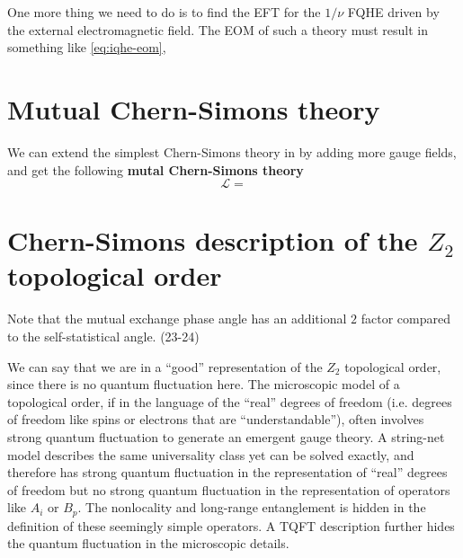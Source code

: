 \documentclass[hyperref, a4paper]{article}
\newcommand*{\concept}[1]{{\textbf{#1}}}
\def\mathbb#1{#1}%
\begin{document}
One more thing we need to do is to find the EFT for the $1 / \nu$ FQHE driven by the external electromagnetic field.
The EOM of such a theory must result in something like \eqref{eq:iqhe-eom}, 

\section{Mutual Chern-Simons theory}

We can extend the simplest Chern-Simons theory in  by adding more gauge fields, and get 
the following \concept{mutal Chern-Simons theory}
\begin{equation}
    \mathcal{L} = 
\end{equation}

\section{Chern-Simons description of the $\mathbb{Z}_2$ topological order}


Note that the mutual exchange phase angle has an additional $2$ factor compared to the self-statistical angle. (23-24) \cite{sachdev-lec10} 

We can say that we are in a ``good'' representation of the $\mathbb{Z}_2$ topological order, since there is no 
quantum fluctuation here. The microscopic model of a topological order, if in the language of the ``real'' 
degrees of freedom (i.e. degrees of freedom like spins or electrons that are ``understandable''), often involves strong quantum fluctuation to generate an emergent gauge theory.
A string-net model describes the same universality class yet can be solved exactly, and therefore has 
strong quantum fluctuation in the representation of ``real'' degrees of freedom but no strong quantum 
fluctuation in the representation of operators like $A_i$ or $B_p$. The nonlocality and long-range entanglement 
is hidden in the definition of these seemingly simple operators. A TQFT description further hides the 
quantum fluctuation in the microscopic details.


 
\end{document}
